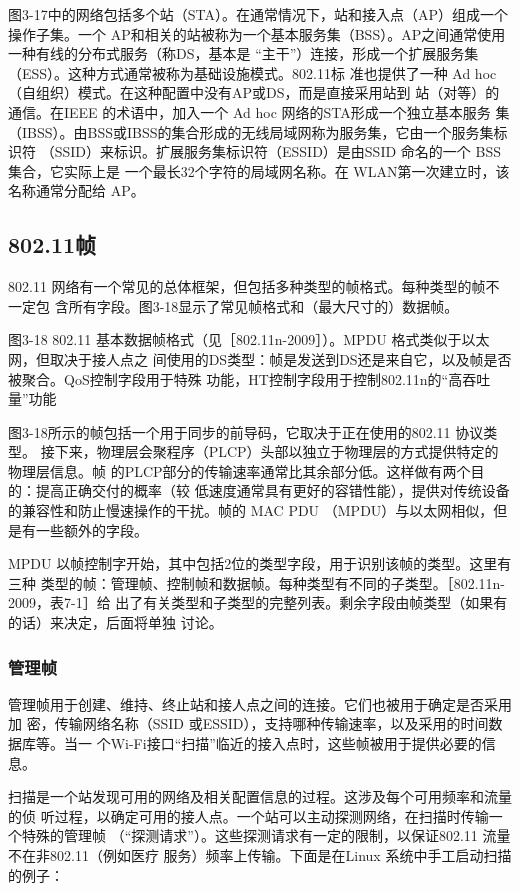 图3-17中的网络包括多个站（STA）。在通常情况下，站和接入点（AP）组成一个操作子集。一个
AP和相关的站被称为一个基本服务集（BSS）。AP之间通常使用一种有线的分布式服务（称DS，基本是
“主干”）连接，形成一个扩展服务集（ESS）。这种方式通常被称为基础设施模式。802.11标
准也提供了一种 Ad hoc（自组织）模式。在这种配置中没有AP或DS，而是直接采用站到
站（对等）的通信。在IEEE 的术语中，加入一个 Ad hoc 网络的STA形成一个独立基本服务
集（IBSS）。由BSS或IBSS的集合形成的无线局域网称为服务集，它由一个服务集标识符
（SSID）来标识。扩展服务集标识符（ESSID）是由SSID 命名的一个 BSS集合，它实际上是
一个最长32个字符的局域网名称。在 WLAN第一次建立时，该名称通常分配给 AP。

\subsection{802.11帧}

802.11 网络有一个常见的总体框架，但包括多种类型的帧格式。每种类型的帧不一定包
含所有字段。图3-18显示了常见帧格式和（最大尺寸的）数据帧。

图3-18
802.11 基本数据帧格式（见［802.11n-2009］）。MPDU 格式类似于以太网，但取决于接人点之
间使用的DS类型：帧是发送到DS还是来自它，以及帧是否被聚合。QoS控制字段用于特殊
功能，HT控制字段用于控制802.11n的“高吞吐量”功能

图3-18所示的帧包括一个用于同步的前导码，它取决于正在使用的802.11 协议类型。
接下来，物理层会聚程序（PLCP）头部以独立于物理层的方式提供特定的物理层信息。帧
的PLCP部分的传输速率通常比其余部分低。这样做有两个目的：提高正确交付的概率（较
低速度通常具有更好的容错性能），提供对传统设备的兼容性和防止慢速操作的干扰。帧的
MAC PDU （MPDU）与以太网相似，但是有一些额外的字段。

MPDU 以帧控制字开始，其中包括2位的类型字段，用于识别该帧的类型。这里有三种
类型的帧：管理帧、控制帧和数据帧。每种类型有不同的子类型。［802.11n-2009，表7-1］给
出了有关类型和子类型的完整列表。剩余字段由帧类型（如果有的话）来决定，后面将单独
讨论。

\subsubsection{管理帧}

管理帧用于创建、维持、终止站和接人点之间的连接。它们也被用于确定是否采用加
密，传输网络名称（SSID 或ESSID），支持哪种传输速率，以及采用的时间数据库等。当一
个Wi-Fi接口“扫描”临近的接入点时，这些帧被用于提供必要的信息。

扫描是一个站发现可用的网络及相关配置信息的过程。这涉及每个可用频率和流量的侦
听过程，以确定可用的接人点。一个站可以主动探测网络，在扫描时传输一个特殊的管理帧
（“探测请求”）。这些探测请求有一定的限制，以保证802.11 流量不在非802.11（例如医疗
服务）频率上传输。下面是在Linux 系统中手工启动扫描的例子：

